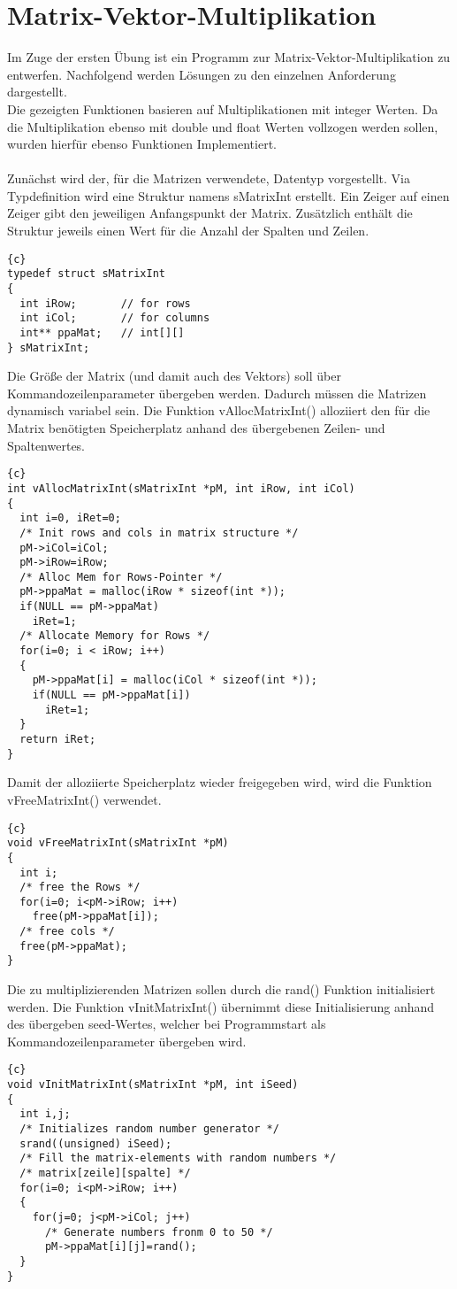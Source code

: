 \documentclass{article}
\newcommand{\enterProblemHeader}[1]{
}
\newcommand{\exitProblemHeader}[1]{
}
\newcounter{homeworkProblemCounter} %
\newcommand{\homeworkProblemName}{}
\newenvironment{homeworkProblem}[1][Problem \arabic{homeworkProblemCounter}]{ %
\stepcounter{homeworkProblemCounter} %
\renewcommand{\homeworkProblemName}{#1} %
\section{\homeworkProblemName} %
}{
}
\begin{document}
\begin{homeworkProblem}[Matrix-Vektor-Multiplikation]
Im Zuge der ersten Übung ist ein Programm zur Matrix-Vektor-Multiplikation zu entwerfen.
Nachfolgend werden Lösungen zu den einzelnen Anforderung dargestellt.
\\
Die gezeigten Funktionen basieren auf Multiplikationen mit integer Werten. Da die 
Multiplikation ebenso mit double und float Werten vollzogen werden sollen, wurden
hierfür ebenso Funktionen Implementiert.
\\ \\
Zunächst wird der, für die Matrizen verwendete, Datentyp vorgestellt. Via Typdefinition
wird eine Struktur namens sMatrixInt erstellt. Ein Zeiger auf einen Zeiger gibt den
jeweiligen Anfangspunkt der Matrix. Zusätzlich enthält die Struktur jeweils einen Wert für die
Anzahl der Spalten und Zeilen.
\begin{lstlisting}{c}
typedef struct sMatrixInt
{
  int iRow;       // for rows
  int iCol;       // for columns
  int** ppaMat;   // int[][]
} sMatrixInt;
\end{lstlisting}

Die Größe der Matrix (und damit auch des Vektors) soll über Kommandozeilenparameter
übergeben werden. Dadurch müssen die Matrizen dynamisch variabel sein. Die Funktion
vAllocMatrixInt() alloziiert den für die Matrix benötigten Speicherplatz anhand des
übergebenen Zeilen- und Spaltenwertes.
\begin{lstlisting}{c}
int vAllocMatrixInt(sMatrixInt *pM, int iRow, int iCol)
{ 
  int i=0, iRet=0;
  /* Init rows and cols in matrix structure */
  pM->iCol=iCol;
  pM->iRow=iRow;
  /* Alloc Mem for Rows-Pointer */
  pM->ppaMat = malloc(iRow * sizeof(int *));
  if(NULL == pM->ppaMat)
    iRet=1;
  /* Allocate Memory for Rows */
  for(i=0; i < iRow; i++)
  {
    pM->ppaMat[i] = malloc(iCol * sizeof(int *));
    if(NULL == pM->ppaMat[i])
      iRet=1;
  }
  return iRet;
}
\end{lstlisting}

Damit der alloziierte Speicherplatz wieder freigegeben wird, wird die Funktion
vFreeMatrixInt() verwendet.
\begin{lstlisting}{c}
void vFreeMatrixInt(sMatrixInt *pM)
{
  int i;
  /* free the Rows */
  for(i=0; i<pM->iRow; i++)
    free(pM->ppaMat[i]);
  /* free cols */
  free(pM->ppaMat);
}
\end{lstlisting}

Die zu multiplizierenden Matrizen sollen durch die rand() Funktion initialisiert werden.
Die Funktion vInitMatrixInt() übernimmt diese Initialisierung anhand des übergeben 
seed-Wertes, welcher bei Programmstart als Kommandozeilenparameter übergeben wird.
\begin{lstlisting}{c}
void vInitMatrixInt(sMatrixInt *pM, int iSeed)
{
  int i,j;
  /* Initializes random number generator */
  srand((unsigned) iSeed);
  /* Fill the matrix-elements with random numbers */
  /* matrix[zeile][spalte] */
  for(i=0; i<pM->iRow; i++)
  {
    for(j=0; j<pM->iCol; j++)
      /* Generate numbers fronm 0 to 50 */
      pM->ppaMat[i][j]=rand();
  }
}
\end{lstlisting}


\end{homeworkProblem}
\end{document}
